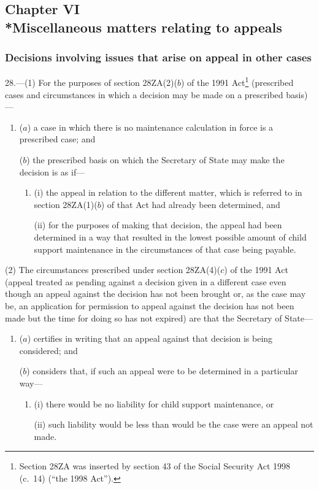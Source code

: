 \documentclass[12pt,a4paper]{article}
\begin{document}
\subsection[Chapter VI --- Miscellaneous matters relating to appeals]{Chapter VI\\*Miscellaneous matters relating to appeals}

\renewcommand\parthead{--- Part III Chapter VI}

\subsubsection[28. Decisions involving issues that arise on appeal in other cases]{Decisions involving issues that arise on appeal in other cases}

28.---(1)  For the purposes of section 28ZA(2)($b$)  of the 1991 Act\footnote{Section 28ZA was inserted by section 43 of the Social Security Act 1998 (c.~14) (“the 1998 Act”).} (prescribed cases and circumstances in which a decision may be made on a prescribed basis)—
\begin{enumerate}\item[]
($a$) a case in which there is no maintenance calculation in force is a prescribed case; and

($b$) the prescribed basis on which the Secretary of State may make the decision is as if—
\begin{enumerate}\item[]
(i) the appeal in relation to the different matter, which is referred to in section 28ZA(1)($b$)  of that Act had already been determined, and

(ii) for the purposes of making that decision, the appeal had been determined in a way that resulted in the lowest possible amount of child support maintenance in the circumstances of that case being payable.
\end{enumerate}
\end{enumerate}

(2) The circumstances prescribed under section 28ZA(4)($c$)  of the 1991 Act (appeal treated as pending against a decision given in a different case even though an appeal against the decision has not been brought or, as the case may be, an application for permission to appeal against the decision has not been made but the time for doing so has not expired) are that the Secretary of State—
\begin{enumerate}\item[]
($a$) certifies in writing that an appeal against that decision is being considered; and

($b$) considers that, if such an appeal were to be determined in a particular way—
\begin{enumerate}\item[]
(i) there would be no liability for child support maintenance, or

(ii) such liability would be less than would be the case were an appeal not made.
\end{enumerate}
\end{enumerate}
\end{document}
